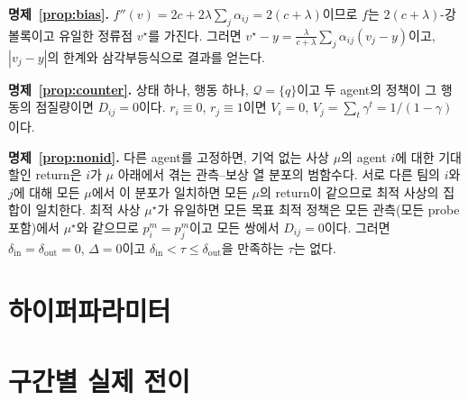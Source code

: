 \documentclass[twocolumn,10pt]{article}
\theoremstyle{remark}
\begin{document}
\textbf{명제~\ref{prop:bias}.} $f''(v)=2c+2\lambda\sum_j\alpha_{ij}=2(c+\lambda)$이므로 $f$는 $2(c+\lambda)$-강볼록이고 유일한 정류점 $v^\star$를 가진다. 그러면
$v^\star-y=\frac{\lambda}{c+\lambda}\sum_j\alpha_{ij}(v_j-y)$이고, $|v_j-y|$의 한계와 삼각부등식으로 결과를 얻는다.

\textbf{명제~\ref{prop:counter}.} 상태 하나, 행동 하나, $\mathcal{Q}=\{q\}$이고 두 agent의 정책이 그 행동의 점질량이면 $D_{ij}=0$이다. $r_i\equiv0$, $r_j\equiv1$이면 $V_i=0$,
$V_j=\sum_t\gamma^t=1/(1-\gamma)$이다.

\textbf{명제~\ref{prop:nonid}.} 다른 agent를 고정하면, 기억 없는 사상 $\mu$의 agent $i$에 대한 기대 할인 return은 $i$가 $\mu$ 아래에서 겪는 관측--보상 열 분포의 범함수다. 서로 다른
팀의 $i$와 $j$에 대해 모든 $\mu$에서 이 분포가 일치하면 모든 $\mu$의 return이 같으므로 최적 사상의 집합이 일치한다. 최적 사상 $\mu^\star$가 유일하면 모든 목표 최적 정책은 모든
관측(모든 probe 포함)에서 $\mu^\star$와 같으므로 $p_i^m=p_j^m$이고 모든 쌍에서 $D_{ij}=0$이다. 그러면 $\delta_{\mathrm{in}}=\delta_{\mathrm{out}}=0$, $\Delta=0$이고
$\delta_{\mathrm{in}}<\tau\le\delta_{\mathrm{out}}$을 만족하는 $\tau$는 없다.

\section{하이퍼파라미터}
\begin{table}[h]
\centering
\small

\caption{처음부터 학습한 E1 비교의 설정(donor 집합을 제외하고 모든 방법이 동일).}
\end{table}

\section{구간별 실제 전이}
\begin{table}[h]
\centering
\small

\caption{E1의 학습 구간별 실제 전이(seed 1개). arc는 receiver--donor 방향 연결이다.}
\end{table}
\end{document}
